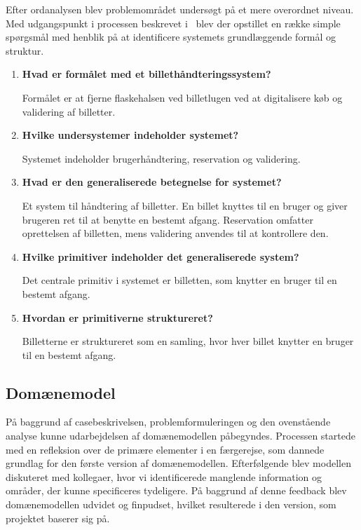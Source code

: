 \documentclass[a4paper, 11pt]{article}
\begin{document}
\newpage

Efter ordanalysen blev problemområdet undersøgt på et mere overordnet niveau. Med udgangspunkt
i processen beskrevet i~\cite{architecting_large_software_projects} blev der opstillet en række
simple spørgsmål med henblik på at identificere systemets grundlæggende formål og struktur.

\begin{enumerate}
\item \textbf{Hvad er formålet med et billethåndteringssystem?}

Formålet er at fjerne flaskehalsen ved billetlugen ved at digitalisere køb og validering af
billetter.

\item \textbf{Hvilke undersystemer indeholder systemet?}

Systemet indeholder brugerhåndtering, reservation og validering.

\item \textbf{Hvad er den generaliserede betegnelse for systemet?}

Et system til håndtering af billetter. En billet knyttes til en bruger og giver
brugeren ret til at benytte en bestemt afgang. Reservation omfatter oprettelsen af billetten,
mens validering anvendes til at kontrollere den.

\item \textbf{Hvilke primitiver indeholder det generaliserede system?}

Det centrale primitiv i systemet er billetten, som knytter en bruger til en bestemt afgang.

\item \textbf{Hvordan er primitiverne struktureret?}

Billetterne er struktureret som en samling, hvor hver billet knytter en bruger til en bestemt
afgang.

\end{enumerate}

\newpage

\subsection{Domænemodel}

På baggrund af casebeskrivelsen, problemformuleringen og den ovenstående analyse kunne
udarbejdelsen af domænemodellen påbegyndes. Processen startede med en refleksion over de
primære elementer i en færgerejse, som dannede grundlag for den første version af
domænemodellen. Efterfølgende blev modellen diskuteret med kollegaer, hvor vi identificerede
manglende information og områder, der kunne specificeres tydeligere. På baggrund af denne
feedback blev domænemodellen udvidet og finpudset, hvilket resulterede i den version, som
projektet baserer sig på.
\end{document}
